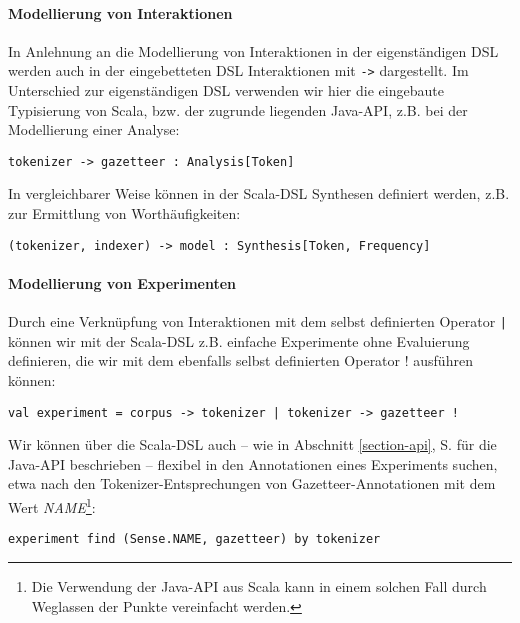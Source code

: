 \documentclass[abstracton, 12pt]{scrartcl}
\begin{document}
\paragraph{Modellierung von Interaktionen}

In Anlehnung an die Modellierung von Interaktionen in der eigenständigen DSL werden auch in der eingebetteten DSL Interaktionen mit  \lstinline!->! dargestellt. Im Unterschied zur eigenständigen DSL verwenden wir hier die eingebaute Typisierung von Scala, bzw. der zugrunde liegenden Java-API, z.B. bei der Modellierung einer Analyse:

\begin{lstlisting}
tokenizer -> gazetteer : Analysis[Token]
\end{lstlisting}

In vergleichbarer Weise können in der Scala-DSL Synthesen definiert werden, z.B. zur Ermittlung von Worthäufigkeiten:

\begin{lstlisting}
(tokenizer, indexer) -> model : Synthesis[Token, Frequency]
\end{lstlisting}

\paragraph{Modellierung von Experimenten} \label{dsl-model-experiments}

Durch eine Verknüpfung von Interaktionen mit dem selbst definierten Operator \lstinline!|! können wir mit der Scala-DSL z.B. einfache Experimente ohne Evaluierung definieren, die wir mit dem ebenfalls selbst definierten Operator \lstinline!!! ausführen können:

\begin{lstlisting}
val experiment = corpus -> tokenizer | tokenizer -> gazetteer !
\end{lstlisting}

Wir können über die Scala-DSL auch -- wie in Abschnitt \ref{section-api}, S. \pageref{section-api} für die Java-API beschrieben -- flexibel in den Annotationen eines Experiments suchen, etwa nach den Tokenizer-Entsprechungen von Gazetteer-Annotationen mit dem Wert \emph{NAME}\footnote{Die Verwendung der Java-API aus Scala kann in einem solchen Fall durch Weglassen der Punkte vereinfacht werden.}:

\begin{lstlisting}
experiment find (Sense.NAME, gazetteer) by tokenizer
\end{lstlisting}
\end{document}
